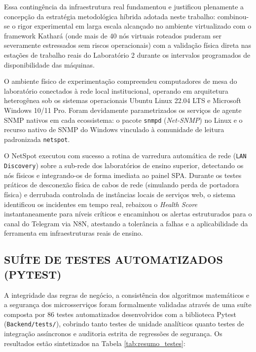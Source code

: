 \documentclass[12pt,a4paper]{article}
\begin{document}
Essa contingência da infraestrutura real fundamentou e justificou plenamente a concepção da estratégia metodológica híbrida adotada neste trabalho: combinou-se o rigor experimental em larga escala alcançado no ambiente virtualizado com o framework Kathará (onde mais de 40 nós virtuais roteados puderam ser severamente estressados sem riscos operacionais) com a validação física direta nas estações de trabalho reais do Laboratório 2 durante os intervalos programados de disponibilidade das máquinas.

O ambiente físico de experimentação compreendeu computadores de mesa do laboratório conectados à rede local institucional, operando em arquitetura heterogênea sob os sistemas operacionais Ubuntu Linux 22.04 LTS e Microsoft Windows 10/11 Pro. Foram devidamente parametrizados os serviços de agente SNMP nativos em cada ecossistema: o pacote \texttt{snmpd} (\textit{Net-SNMP}) no Linux e o recurso nativo de SNMP do Windows vinculado à comunidade de leitura padronizada \texttt{netspot}.

O NetSpot executou com sucesso a rotina de varredura automática de rede (\texttt{LAN Discovery}) sobre a sub-rede dos laboratórios de ensino superior, detectando os nós físicos e integrando-os de forma imediata ao painel SPA. Durante os testes práticos de desconexão física de cabos de rede (simulando perda de portadora física) e derrubada controlada de instâncias locais de serviços web, o sistema identificou os incidentes em tempo real, rebaixou o \textit{Health Score} instantaneamente para níveis críticos e encaminhou os alertas estruturados para o canal do Telegram via N8N, atestando a tolerância a falhas e a aplicabilidade da ferramenta em infraestruturas reais de ensino.

\subsection{SUÍTE DE TESTES AUTOMATIZADOS (PYTEST)}
A integridade das regras de negócio, a consistência dos algoritmos matemáticos e a segurança dos microsserviços foram formalmente validadas através de uma suíte composta por 86 testes automatizados desenvolvidos com a biblioteca Pytest (\texttt{Backend/tests/}), cobrindo tanto testes de unidade analíticos quanto testes de integração assíncronos e auditoria estrita de regressões de segurança. Os resultados estão sintetizados na Tabela \ref{tab:resumo_testes}:
\end{document}
